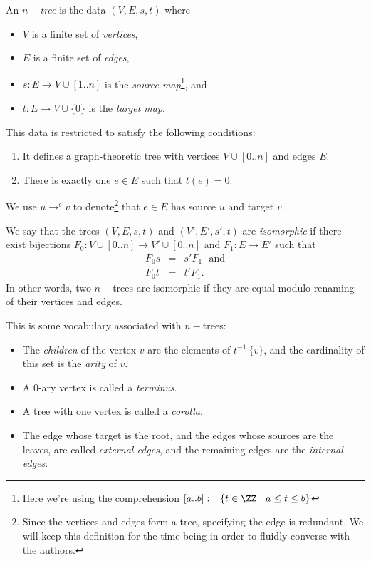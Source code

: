 
\begin{defn}\label{def-tree}
	An $n-$\emph{tree} is the data $(V, E, s, t)$ where
	\begin{itemize}
		\item $V$ is a finite set of \emph{vertices},
		\item $E$ is a finite set of \emph{edges},
		\item $s : E \to V \cup [1..n]$ is the
			\emph{source map}\footnote{Here we're using the
			comprehension $[a..b] :=
			\{t \in \ZZ \ | \ a \leq t \leq b\}$}, and
		\item $t : E \to V \cup \{0\}$ is the \emph{target map}.
	\end{itemize}
	This data is restricted to satisfy the following conditions:
	\begin{enumerate}
		\item It defines a graph-theoretic tree with vertices
			$V \cup [0..n]$ and edges $E$.
		\item There is exactly one $e \in E$ such that $t(e) = 0$.
	\end{enumerate}
	We use $u \to^{e} v$ to denote\footnote{Since the vertices and
	edges form a tree,  specifying the edge is redundant. We will keep
	this definition for the time being in order to fluidly converse
	with the authors.} that $e \in E$ has source $u$ and target $v$.
\end{defn}

\begin{defn}\label{tree-iso}
	We say that the trees $(V,E,s,t)$ and $(V',E',s',t)$ are
	\emph{isomorphic} if there exist bijections $F_0 : V \cup [0..n]
	\to V' \cup [0..n]$ and $F_1 : E \to E'$ such that
	\begin{eqnarray}
		F_0 s &=& s' F_1 \ \ \ \text{and} \\
		F_0 t &=& t' F_1.
	\end{eqnarray}
	In other words, two $n-$trees are isomorphic if they are equal
	modulo renaming of their vertices and edges.
\end{defn}

\begin{defn}\label{tree-v}
	This is some vocabulary associated with $n-$trees:
	\begin{itemize}
		\item The \emph{children} of the vertex $v$ are the
			elements of $t^{-1} \ \{ v \}$, and the cardinality
			of this set is the \emph{arity} of $v$.
		\item A 0-ary vertex is called a \emph{terminus}.
		\item A tree with one vertex is called a \emph{corolla}.
		\item The edge whose target is the root, and the edges
			whose sources are the leaves, are called
			\emph{external edges}, and the remaining edges are
			the \emph{internal edges}.
	\end{itemize}
\end{defn}


